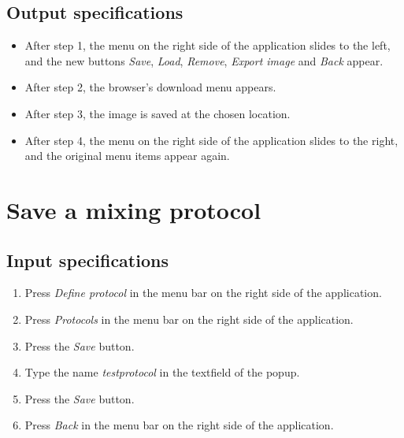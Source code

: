 \subsection*{Output specifications}
\begin{itemize}
\item After step 1, the menu on the right side of the application slides to the left, and the new buttons \emph{Save}, \emph{Load}, \emph{Remove}, \emph{Export image} and \emph{Back} appear.
\item After step 2, the browser's download menu appears.
\item After step 3, the image is saved at the chosen location.
\item After step 4, the menu on the right side of the application slides to the right, and the original menu items appear again.
\end{itemize}

\section{Save a mixing protocol}

\subsection*{Input specifications}
\begin{enumerate}
\item Press \emph{Define protocol} in the menu bar on the right side of the application.
\item Press \emph{Protocols} in the menu bar on the right side of the application.
\item Press the \emph{Save} button.
\item Type the name \emph{testprotocol} in the textfield of the popup.
\item Press the \emph{Save} button.
\item Press \emph{Back} in the menu bar on the right side of the application.
\end{enumerate}

